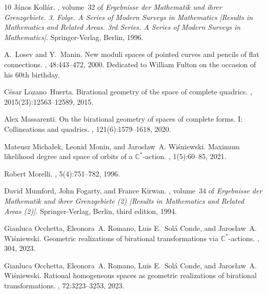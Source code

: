\documentclass[10pt,a4paper]{article}
\numberwithin{equation}{section}
\theoremstyle{definition}
\theoremstyle{remark}
\begin{document}
\begin{thebibliography}{10}
J{\'a}nos Koll{\'a}r.
, volume~32 of {\em
  Ergebnisse der Mathematik und ihrer Grenzgebiete. 3. Folge. A Series of
  Modern Surveys in Mathematics [Results in Mathematics and Related Areas. 3rd
  Series. A Series of Modern Surveys in Mathematics]}.
\newblock Springer-Verlag, Berlin, 1996.

A.~Losev and Y.~Manin.
\newblock New moduli spaces of pointed curves and pencils of flat connections.
, 48:443--472, 2000.
\newblock Dedicated to William Fulton on the occasion of his 60th birthday.

C{\'e}sar Lozano~Huerta.
\newblock Birational geometry of the space of complete quadrics.
, 2015(23):12563--12589, 2015.

Alex Massarenti.
\newblock On the birational geometry of spaces of complete forms. {I}:
  {Collineations} and quadrics.
, 121(6):1579--1618, 2020.

Mateusz Micha{\l}ek, Leonid Monin, and Jaros{\l}aw~A. Wi\'sniewski.
\newblock Maximum likelihood degree and space of orbits of a
  $\mathbb{C}^*$-action.
, 1(5):60--85, 2021.

Robert {Morelli}.
, 5(4):751--782, 1996.

David Mumford, John Fogarty, and France Kirwan.
, volume~34 of {\em Ergebnisse der
  Mathematik und ihrer Grenzgebiete (2) [Results in Mathematics and Related
  Areas (2)]}.
\newblock Springer-Verlag, Berlin, third edition, 1994.

Gianluca Occhetta, Eleonora~A. Romano, Luis E.~Sol\'a Conde, and Jaros{\l}aw~A.
  Wi{\'s}niewski.
\newblock Geometric realizations of birational transformations via
  $\mathbb{C}^*$-actions.
, 304, 2023.

Gianluca Occhetta, Eleonora~A. Romano, Luis E.~Sol\'a Conde, and Jaros{\l}aw~A.
  Wi{\'s}niewski.
\newblock Rational homogeneous spaces as geometric realizations of birational
  transformations.
, 72:3223--3253, 2023.


\end{thebibliography}
\end{document}

